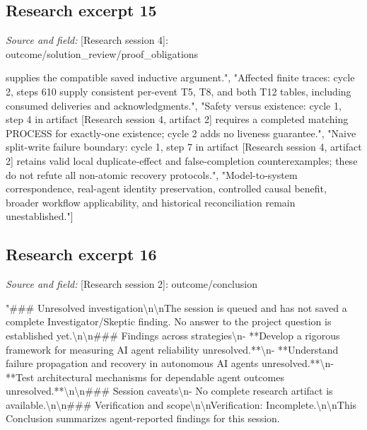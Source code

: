 \documentclass[11pt]{article}
\begin{document}
\subsection{Research excerpt 15}
\textit{Source and field: }[Research session 4]: outcome/solution\_review/proof\_obligations\par
["Lifecycle and request conservation: cycle 2, steps 1\textendash{}4 establish explicit location transfers and crash outcomes under the chosen transport premises.", "Durable atomic safety: cycle 2, step 5 establishes preservation under the refined transitions; cycle 1, step 3 in artifact [Research session 4, artifact 2] supplies the compatible saved inductive argument.", "Affected finite traces: cycle 2, steps 6\textendash{}10 supply consistent per-event T5, T8, and both T12 tables, including consumed deliveries and acknowledgments.", "Safety versus existence: cycle 1, step 4 in artifact [Research session 4, artifact 2] requires a completed matching PROCESS for exactly-one existence; cycle 2 adds no liveness guarantee.", "Naive split-write failure boundary: cycle 1, step 7 in artifact [Research session 4, artifact 2] retains valid local duplicate-effect and false-completion counterexamples; these do not refute all non-atomic recovery protocols.", "Model-to-system correspondence, real-agent identity preservation, controlled causal benefit, broader workflow applicability, and historical reconciliation remain unestablished."]

\subsection{Research excerpt 16}
\textit{Source and field: }[Research session 2]: outcome/conclusion\par
"\#\#\# Unresolved investigation\textbackslash{}n\textbackslash{}nThe session is queued and has not saved a complete Investigator/Skeptic finding. No answer to the project question is established yet.\textbackslash{}n\textbackslash{}n\#\#\# Findings across strategies\textbackslash{}n- **Develop a rigorous framework for measuring AI agent reliability \textemdash{} unresolved.**\textbackslash{}n- **Understand failure propagation and recovery in autonomous AI agents \textemdash{} unresolved.**\textbackslash{}n- **Test architectural mechanisms for dependable agent outcomes \textemdash{} unresolved.**\textbackslash{}n\textbackslash{}n\#\#\# Session caveats\textbackslash{}n- No complete research artifact is available.\textbackslash{}n\textbackslash{}n\#\#\# Verification and scope\textbackslash{}n\textbackslash{}nVerification: Incomplete.\textbackslash{}n\textbackslash{}nThis Conclusion summarizes agent-reported findings for this session.
\end{document}
